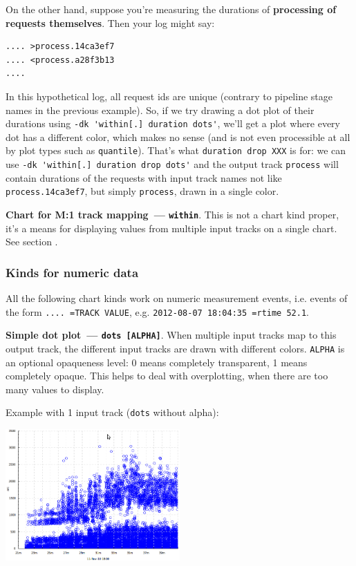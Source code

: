 \documentclass{article}
\begin{document}
On the other hand, suppose you're measuring the durations of \textbf{processing of requests themselves}. Then your log might say:
\begin{verbatim}
.... >process.14ca3ef7
.... <process.a28f3b13
....
\end{verbatim}

In this hypothetical log, all request ids are unique (contrary to pipeline stage names in the previous example). So, if we try drawing a dot plot of their durations using \verb|-dk 'within[.] duration dots'|, we'll get a plot where every dot has a different color, which makes no sense (and is not even processible at all by plot types such as \verb|quantile|). That's what \verb|duration drop XXX| is for: we can use \verb|-dk 'within[.] duration drop dots'| and the output track \verb|process| will contain durations of the requests with input track names not like \verb|process.14ca3ef7|, but simply \verb|process|, drawn in a single color.

\noindent
\textbf{Chart for M:1 track mapping~--- \texttt{within}}. This is not a chart kind proper, it's a means for displaying values from multiple input tracks on a single chart. See section .


\pagebreak
\subsubsection{Kinds for numeric data}
All the following chart kinds work on numeric measurement events, i.e. events of the form \texttt{.... =TRACK VALUE}, e.g. \texttt{2012-08-07 18:04:35 =rtime 52.1}.

\noindent
\textbf{Simple dot plot~--- \texttt{dots [ALPHA]}}. When multiple input tracks map to this output track, the different input tracks are drawn with different colors. \texttt{ALPHA} is an optional opaqueness level: 0 means completely transparent, 1 means completely opaque. This helps to deal with overplotting, when there are too many values to display.

Example with 1 input track (\texttt{dots} without alpha):

\centerline{\includegraphics[width=0.5\textwidth]{pics/tplot/dots.png}}
\end{document}
